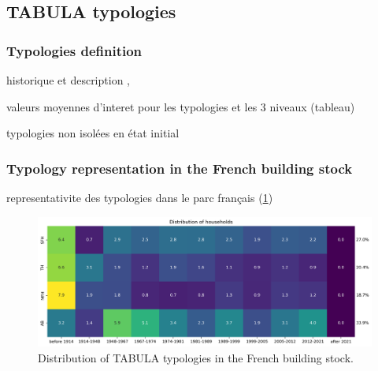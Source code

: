 \documentclass[11pt]{article}
\begin{document}

    \subsection{TABULA typologies} %
    \label{sub:tabula_typologies}
    
        \subsubsection{Typologies definition} %
        \label{ssub:typologies_definition}
        
        historique et description
        \cite{pouget_consultants_batiments_2015}, \cite{loga_tabula_2016}

        valeurs moyennes d'interet pour les typologies et les 3 niveaux (tableau)

        typologies non isolées en état initial 

        \subsubsection{Typology representation in the French building stock} %
        \label{ssub:typologies_distribution}
        
        representativite des typologies dans le parc français (\ref{fig:tab_stock})

        \begin{figure}[ht]
            \centering
            \includegraphics[width=0.99\columnwidth]{figures/bgc_distribution_tabula_households_ponderated.png}
            \caption{\label{fig:tab_stock} Distribution of TABULA typologies in the French building stock.}
        \end{figure}
\end{document}
